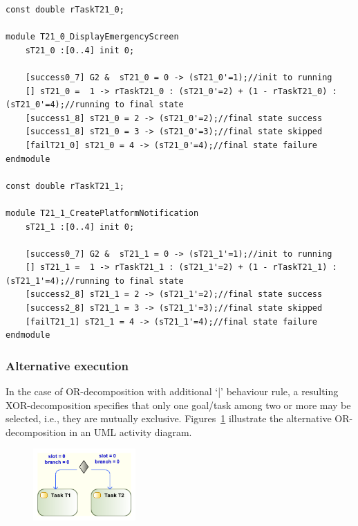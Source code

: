 \begin{lstlisting}[language=Prism, caption={Interleaved tasks T21.0 and T21.1 as DTMC modules with initial transitions synchronized and running transitions interleaved.},label={lst:PRISM_INT_TSKS}] 
const double rTaskT21_0;

module T21_0_DisplayEmergencyScreen
	sT21_0 :[0..4] init 0;
	
	[success0_7] G2 &  sT21_0 = 0 -> (sT21_0'=1);//init to running
	[] sT21_0 =  1 -> rTaskT21_0 : (sT21_0'=2) + (1 - rTaskT21_0) : (sT21_0'=4);//running to final state
	[success1_8] sT21_0 = 2 -> (sT21_0'=2);//final state success
	[success1_8] sT21_0 = 3 -> (sT21_0'=3);//final state skipped
	[failT21_0] sT21_0 = 4 -> (sT21_0'=4);//final state failure
endmodule

const double rTaskT21_1;

module T21_1_CreatePlatformNotification
	sT21_1 :[0..4] init 0;
	
	[success0_7] G2 &  sT21_1 = 0 -> (sT21_1'=1);//init to running
	[] sT21_1 =  1 -> rTaskT21_1 : (sT21_1'=2) + (1 - rTaskT21_1) : (sT21_1'=4);//running to final state
	[success2_8] sT21_1 = 2 -> (sT21_1'=2);//final state success
	[success2_8] sT21_1 = 3 -> (sT21_1'=3);//final state skipped
	[failT21_1] sT21_1 = 4 -> (sT21_1'=4);//final state failure
endmodule
\end{lstlisting}


\subsubsection{Alternative execution}

In the case of OR-decomposition with additional `|' behaviour rule, a resulting XOR-decomposition specifies that only one goal/task among two or more may be selected, i.e., they are mutually exclusive. Figures~\ref{fig:UML_ALT_TSKS} illustrate the alternative OR-decomposition in an UML activity diagram.

\begin{figure}[ht!]
\centering
\includegraphics[width=0.35\textwidth]{imgs/UML_ALT_TSKS.png}
\caption{}
\label{fig:UML_ALT_TSKS}
\end{figure}

